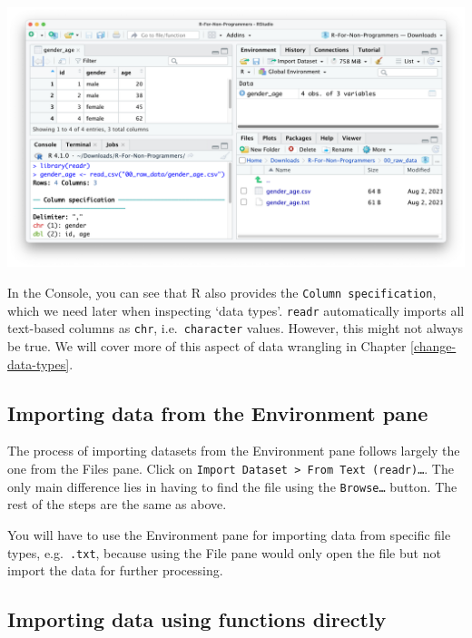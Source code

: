 \documentclass[
]{book}
\begin{document}
\begin{enumerate}
  \includegraphics{images/chapter_07_img/01_files_pane_import/04_files_pane_import.png}
\end{enumerate}

In the Console, you can see that R also provides the \texttt{Column\ specification}, which we need later when inspecting `data types'. \texttt{readr} automatically imports all text-based columns as \texttt{chr}, i.e.~\texttt{character} values. However, this might not always be true. We will cover more of this aspect of data wrangling in Chapter \ref{change-data-types}.

\hypertarget{importing-data-from-the-environment-pane}{%
\subsection{Importing data from the Environment pane}\label{importing-data-from-the-environment-pane}}

The process of importing datasets from the Environment pane follows largely the one from the Files pane. Click on \texttt{Import\ Dataset\ \textgreater{}\ From\ Text\ (readr)\ldots{}}. The only main difference lies in having to find the file using the \texttt{Browse\ldots{}} button. The rest of the steps are the same as above.

You will have to use the Environment pane for importing data from specific file types, e.g.~\texttt{.txt}, because using the File pane would only open the file but not import the data for further processing.

\hypertarget{importing-data-using-functions}{%
\subsection{Importing data using functions directly}\label{importing-data-using-functions}}
\end{document}
